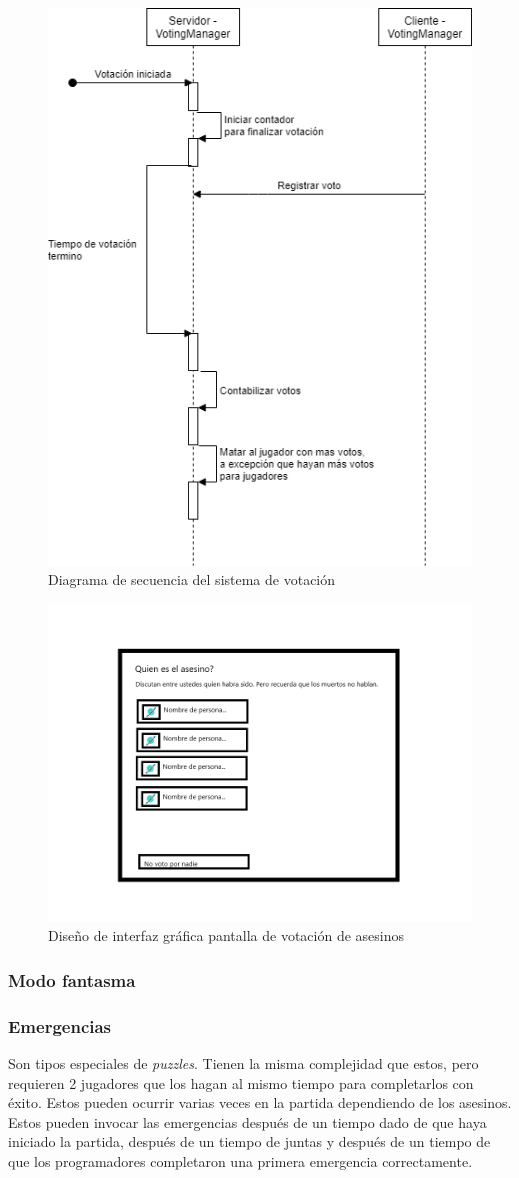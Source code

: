 \begin{figure}[h!]
    \centering
    \includegraphics[width=0.5\linewidth]{images/diagrama_secuencia_votos.png}
    \caption{Diagrama de secuencia del sistema de votación}
    \label{fig:diagrama_sec_votacion}
\end{figure}
\begin{figure}[h!]
    \centering
    \includegraphics[width=0.5\linewidth]{images/votacion.png}
    \caption{Diseño de interfaz gráfica pantalla de votación de asesinos}
    \label{fig:diagrama_ui_votacion}
\end{figure}

\subsubsection{Modo fantasma}


\subsubsection{Emergencias}
Son tipos especiales de \textit{puzzles}. Tienen la misma complejidad que estos, pero requieren 2 jugadores que los hagan al mismo tiempo para completarlos con éxito. Estos pueden ocurrir varias veces en la partida dependiendo de los asesinos. Estos pueden invocar las emergencias después de un tiempo dado de que haya iniciado la partida, después de un tiempo de juntas y después de un tiempo de que los programadores completaron una primera emergencia correctamente.

